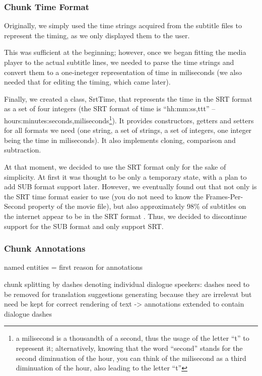 \subsubsection{Chunk Time Format}


Originally, we simply used the time strings acquired from the subtitle files to represent the timing, as we only displayed them to the user.

This was sufficient at the beginning; however, once we began fitting the media player to the actual subtitle lines, we needed to parse the time strings and convert them to a one-ineteger representation of time in miliseconds (we also needed that for editing the timing, which came later).

Finally, we created a class, SrtTime, that represents the time in the SRT format as a set of four integers (the SRT format of time is ``hh:mm:ss,ttt'' -- hours:minutes:seconds,miliseconds\footnote{a milisecond is a thousandth of a second, thus the usage of the letter ``t'' to represent it; alternatively, knowing that the word ``second'' stands for the second diminuation of the hour, you can think of the milisecond as a third diminuation of the hour, also leading to the letter ``t''}).
It provides constructors, getters and setters for all formats we need (one string, a set of strings, a set of integers, one integer being the time in miliseconds). It also implements cloning, comparison and subtraction.

At that moment, we decided to use the SRT format only for the sake of simplicity.
At first it was thought to be only a temporary state, with a plan to add SUB format support later. However, we eventually found out that not only is the SRT time format easier to use (you do not need to know the Frames-Per-Second property of the movie file),
but also approximately 98\% of subtitles on the internet appear to be in the SRT format .
Thus, we decided to discontinue support for the SUB format and only support SRT.

\subsubsection{Chunk Annotations}


named entities = first reason for annotations

chunk splitting by dashes denoting individual dialogue speekers: dashes need to be removed for translation suggestions generating because they are irrelevat but need be kept for correct rendering of text -> annotations extended to contain dialogue dashes

